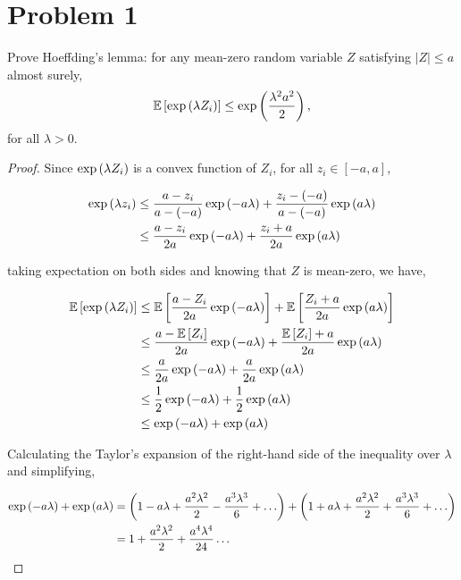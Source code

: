 \section*{Problem 1}
\begin{myanswerbox}
Prove Hoeffding's lemma: for any mean-zero random variable \(Z\) satisfying \(|Z| \leq a\) almost surely,
\[ 
    \mathbb{E}\left[\exp\left(\lambda Z_i\right)\right] \leq \exp\left(\frac{\lambda^2 a^2}{2}\right), 
\]
for all \(\lambda > 0\).
\end{myanswerbox}
\begin{proof}
Since $\exp\left(\lambda Z_i\right)$ is a convex function of $Z_i$, for all $z_i \in [-a, a]$,

\begin{align*}
\exp\left(\lambda z_i\right)
&\leq 
\dfrac{a - z_i}{a - (-a)} \exp\left( -a \lambda\right) + 
\dfrac{z_i - (-a)}{a - (-a)} \exp\left(a \lambda\right) \\
&\leq 
\dfrac{a - z_i}{2a} \exp\left( -a \lambda\right) + 
\dfrac{z_i + a}{2a} \exp\left(a \lambda\right) \\
\end{align*}

taking expectation on both sides and knowing that $Z$ is mean-zero, we have,


\begin{align*}
\mathbb{E}\left[\exp\left(\lambda Z_i\right)\right]
&\leq 
\mathbb{E}\left[\dfrac{a - Z_i}{2a} \exp\left( -a \lambda\right)\right] + 
\mathbb{E}\left[\dfrac{Z_i + a}{2a} \exp\left(a \lambda\right)\right] \\
&\leq 
\dfrac{a - \mathbb{E}\left[Z_i\right]}{2a} \exp\left( -a \lambda\right) + 
\dfrac{\mathbb{E}\left[Z_i\right] + a}{2a} \exp\left(a \lambda\right) \\
&\leq 
\dfrac{a}{2a} \exp\left( -a \lambda\right) + 
\dfrac{a}{2a} \exp\left(a \lambda\right) \\
&\leq 
\dfrac{1}{2} \exp\left( -a \lambda\right) + 
\dfrac{1}{2} \exp\left(a \lambda\right) \\
&\leq 
\exp\left( -a \lambda\right) + 
\exp\left(a \lambda\right) \\
\end{align*}

Calculating the Taylor's expansion of the right-hand side of the inequality over $\lambda$ and simplifying,

\begin{align*}
\exp\left( -a \lambda\right) +
\exp\left(a \lambda\right)
&=
\left(1 - a \lambda + \dfrac{a^2 \lambda^2}{2} - \dfrac{a^3 \lambda^3}{6} + \ldots\right) +
\left(1 + a \lambda + \dfrac{a^2 \lambda^2}{2} + \dfrac{a^3 \lambda^3}{6} + \ldots\right) \\
&=
1 + \dfrac{a^2 \lambda^2}{2} + \dfrac{a^4 \lambda^4}{24}\ldots\\
\end{align*}


\end{proof}
